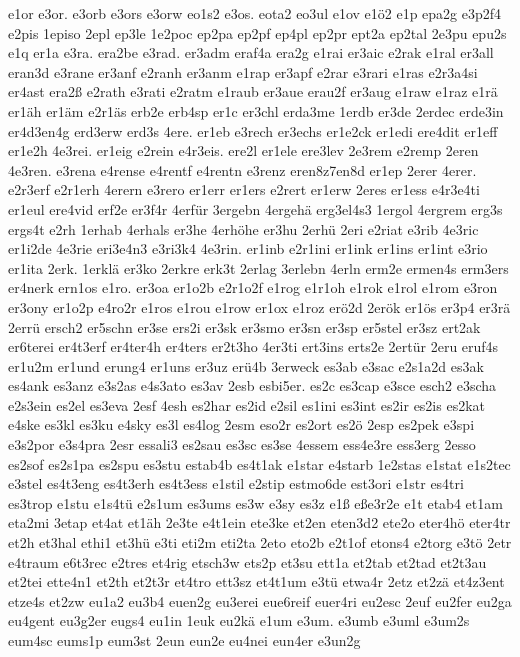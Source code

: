 {e1or
e3or.
e3orb
e3ors
e3orw
eo1s2
e3os.
eota2
eo3ul
e1ov
e1ö2
e1p
epa2g
e3p2f4
e2pis
1episo
2epl
ep3le
1e2poc
ep2pa
ep2pf
ep4pl
ep2pr
ept2a
ep2tal
2e3pu
epu2s
e1q
er1a
e3ra.
era2be
e3rad.
er3adm
eraf4a
era2g
e1rai
er3aic
e2rak
e1ral
er3all
eran3d
e3rane
er3anf
e2ranh
er3anm
e1rap
er3apf
e2rar
e3rari
e1ras
e2r3a4si
er4ast
era2ß
e2rath
e3rati
e2ratm
e1raub
er3aue
erau2f
er3aug
e1raw
e1raz
e1rä
er1äh
er1äm
e2r1äs
erb2e
erb4sp
er1c
er3chl
erda3me
1erdb
er3de
2erdec
erde3in
er4d3en4g
erd3erw
erd3s
4ere.
er1eb
e3rech
er3echs
er1e2ck
er1edi
ere4dit
er1eff
er1e2h
4e3rei.
er1eig
e2rein
e4r3eis.
ere2l
er1ele
ere3lev
2e3rem
e2remp
2eren
4e3ren.
e3rena
e4rense
e4rentf
e4rentn
e3renz
eren8z7en8d
er1ep
2erer
4erer.
e2r3erf
e2r1erh
4erern
e3rero
er1err
er1ers
e2rert
er1erw
2eres
er1ess
e4r3e4ti
er1eul
ere4vid
erf2e
er3f4r
4erfür
3ergebn
4ergehä
erg3el4s3
1ergol
4ergrem
erg3s
ergs4t
e2rh
1erhab
4erhals
er3he
4erhöhe
er3hu
2erhü
2eri
e2riat
e3rib
4e3ric
er1i2de
4e3rie
eri3e4n3
e3ri3k4
4e3rin.
er1inb
e2r1ini
er1ink
er1ins
er1int
e3rio
er1ita
2erk.
1erklä
er3ko
2erkre
erk3t
2erlag
3erlebn
4erln
erm2e
ermen4s
erm3ers
er4nerk
ern1os
e1ro.
er3oa
er1o2b
e2r1o2f
e1rog
e1r1oh
e1rok
e1rol
e1rom
e3ron
er3ony
er1o2p
e4ro2r
e1ros
e1rou
e1row
er1ox
e1roz
erö2d
2erök
er1ös
er3p4
er3rä
2errü
ersch2
er5schn
er3se
ers2i
er3sk
er3smo
er3sn
er3sp
er5stel
er3sz
ert2ak
er6terei
er4t3erf
er4ter4h
er4ters
er2t3ho
4er3ti
ert3ins
erts2e
2ertür
2eru
eruf4s
er1u2m
er1und
erung4
er1uns
er3uz
erü4b
3erweck
es3ab
e3sac
e2s1a2d
es3ak
es4ank
es3anz
e3s2as
e4s3ato
es3av
2esb
esbi5er.
es2c
es3cap
e3sce
esch2
e3scha
e2s3ein
es2el
es3eva
2esf
4esh
es2har
es2id
e2sil
es1ini
es3int
es2ir
es2is
es2kat
e4ske
es3kl
es3ku
e4sky
es3l
es4log
2esm
eso2r
es2ort
es2ö
2esp
es2pek
e3spi
e3s2por
e3s4pra
2esr
essali3
es2sau
es3sc
es3se
4essem
ess4e3re
ess3erg
2esso
es2sof
es2s1pa
es2spu
es3stu
estab4b
es4t1ak
e1star
e4starb
1e2stas
e1stat
e1s2tec
e3stel
es4t3eng
es4t3erh
es4t3ess
e1stil
e2stip
estmo6de
est3ori
e1str
es4tri
es3trop
e1stu
e1s4tü
e2s1um
es3ums
es3w
e3sy
es3z
e1ß
eße3r2e
e1t
etab4
et1am
eta2mi
3etap
et4at
et1äh
2e3te
e4t1ein
ete3ke
et2en
eten3d2
ete2o
eter4hö
eter4tr
et2h
et3hal
ethi1
et3hü
e3ti
eti2m
eti2ta
2eto
eto2b
e2t1of
etons4
e2torg
e3tö
2etr
e4traum
e6t3rec
e2tres
et4rig
etsch3w
ets2p
et3su
ett1a
et2tab
et2tad
et2t3au
et2tei
ette4n1
et2th
et2t3r
et4tro
ett3sz
et4t1um
e3tü
etwa4r
2etz
et2zä
et4z3ent
etze4s
et2zw
eu1a2
eu3b4
euen2g
eu3erei
eue6reif
euer4ri
eu2esc
2euf
eu2fer
eu2ga
eu4gent
eu3g2er
eugs4
eu1in
1euk
eu2kä
e1um
e3um.
e3umb
e3uml
e3um2s
eum4sc
eums1p
eum3st
2eun
eun2e
eu4nei
eun4er
e3un2g
}
